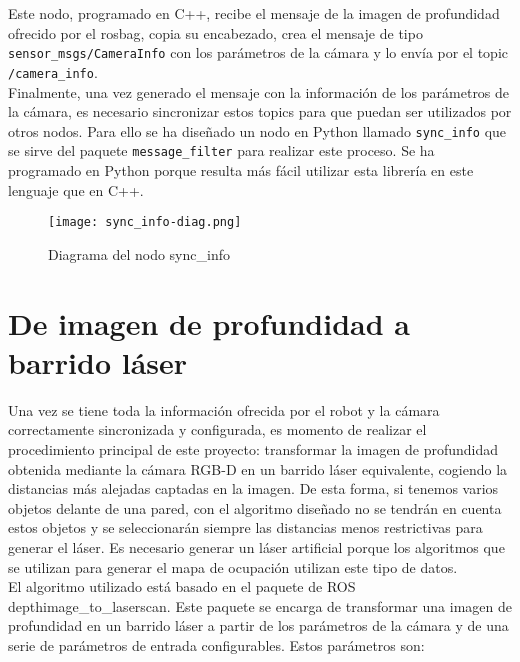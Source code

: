 Este nodo, programado en C++, recibe el mensaje de la imagen de profundidad ofrecido por el rosbag, copia su encabezado, crea el mensaje de tipo \texttt{sensor\_msgs/CameraInfo} con los parámetros de la cámara y lo envía por el topic \texttt{/camera\_info}.\\

Finalmente, una vez generado el mensaje con la información de los parámetros de la cámara, es necesario sincronizar estos topics para que puedan ser utilizados por otros nodos. Para ello se ha diseñado un nodo en Python llamado \texttt{sync\_info} que se sirve del paquete \texttt{message\_filter} para realizar este proceso. Se ha programado en Python porque resulta más fácil utilizar esta librería en este lenguaje que en C++.\\

\begin{figure}[h]
	\begin{center} 
		\texttt{[image: sync\_info-diag.png]}
	\end{center}
	\caption{Diagrama del nodo sync\_info}
	\label{fig:sync_info}
\end{figure}

\section{De imagen de profundidad a barrido láser} \label{depthimage_section}

Una vez se tiene toda la información ofrecida por el robot y la cámara correctamente sincronizada y configurada, es momento de realizar el procedimiento principal de este proyecto: transformar la imagen de profundidad obtenida mediante la cámara RGB-D en un barrido láser equivalente, cogiendo la distancias más alejadas captadas en la imagen. De esta forma, si tenemos varios objetos delante de una pared, con el algoritmo diseñado no se tendrán en cuenta estos objetos y se seleccionarán siempre las distancias menos restrictivas para generar el láser. Es necesario generar un láser artificial porque los algoritmos que se utilizan para generar el mapa de ocupación utilizan este tipo de datos.\\

El algoritmo utilizado está basado en el paquete de ROS depthimage\_to\_laserscan. Este paquete se encarga de transformar una imagen de profundidad en un barrido láser a partir de los parámetros de la cámara y de una serie de parámetros de entrada configurables. Estos parámetros son:

